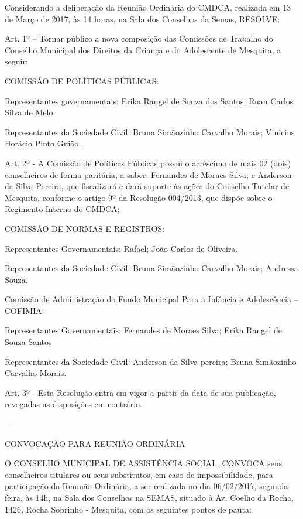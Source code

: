 \documentclass{doliberto}
\begin{document}
Considerando  a  deliberação  da  Reunião  Ordinária  do 
CMDCA, realizada em 13 de Março de 2017, às 14 horas, na 
Sala dos Conselhos da Semas, RESOLVE:   

Art. 1º – Tornar público a nova composição das Comissões 
de Trabalho do Conselho Municipal dos Direitos da Criança 
e do Adolescente de Mesquita, a seguir: 

COMISSÃO DE POLÍTICAS PÚBLICAS:  
 
Representantes  governamentais:  Erika  Rangel  de  Souza 
dos Santos; Ruan Carlos Silva de Melo.  
 
Representantes  da  Sociedade  Civil:  Bruna  Simãozinho 
Carvalho Morais; Vinicius Horácio Pinto Guião.  
 
Art.  2º  -  A  Comissão  de  Políticas  Públicas  possui  o 
acréscimo  de  mais  02  (dois)  conselheiros  de  forma 
paritária, a saber: Fernandes de Moraes Silva; e Anderson da 
Silva  Pereira,  que  fiscalizará  e  dará  suporte  às  ações  do 
Conselho  Tutelar  de  Mesquita,  conforme  o  artigo  9º  da 
Resolução  004/2013,  que  dispõe  sobre  o  Regimento 
Interno do CMDCA;  
 
COMISSÃO DE NORMAS E REGISTROS: 
 
Representantes  Governamentais: 
Rafael; João Carlos de Oliveira. 
 
Representantes  da  Sociedade  Civil:  Bruna  Simãozinho 
Carvalho Morais; Andressa Souza. 
 
Comissão de Administração do Fundo Municipal Para a 
Infância e Adolescência – COFIMIA: 
 
Representantes  Governamentais:  Fernandes  de  Moraes 
Silva; Erika Rangel de Souza Santos 
 
Representantes  da  Sociedade  Civil:  Anderson  da  Silva 
pereira; Bruna Simãozinho Carvalho Morais. 
 
Art. 3º - Esta Resolução entra em vigor a partir da data de 
sua publicação, revogadas as disposições em contrário. 


---

CONVOCAÇÃO PARA REUNIÃO ORDINÁRIA 

O  CONSELHO  MUNICIPAL  DE  ASSISTÊNCIA  SOCIAL, 
CONVOCA  seus  conselheiros  titulares  ou  seus  substitutos, 
em  caso  de  impossibilidade,  para  participação  da  Reunião 
Ordinária,  a  ser  realizada  no  dia  06/02/2017,  segunda-
feira, às 14h, na Sala dos Conselhos na SEMAS, situado à Av. 
Coelho da Rocha, 1426, Rocha Sobrinho - Mesquita, com os 
seguintes pontos de pauta: 
\end{document}
